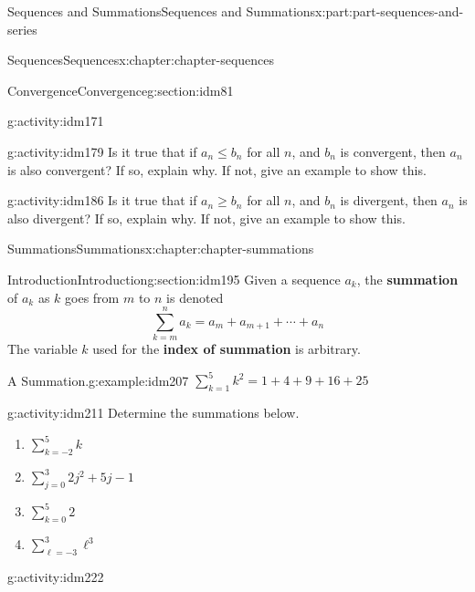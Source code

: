 \documentclass[oneside,10pt,]{book}
\newcommand{\terminology}[1]{\textbf{#1}}
\numberwithin{equation}{section}
\begin{document}
\begin{partptx}{Sequences and Summations}{}{Sequences and Summations}{}{}{x:part:part-sequences-and-series}
\begin{chapterptx}{Sequences}{}{Sequences}{}{}{x:chapter:chapter-sequences}
\begin{sectionptx}{Convergence}{}{Convergence}{}{}{g:section:idm81}
\begin{activity}{}{g:activity:idm171}
\end{activity}
\begin{activity}{}{g:activity:idm179}%
Is it true that if \(a_n \leq b_n\) for all \(n\), and \(b_n\) is convergent, then \(a_n\) is also convergent? If so, explain why. If not, give an example to show this.%
\end{activity}
\begin{activity}{}{g:activity:idm186}%
Is it true that if \(a_n \geq b_n\) for all \(n\), and \(b_n\) is divergent, then \(a_n\) is also divergent? If so, explain why. If not, give an example to show this.%
\end{activity}
\end{sectionptx}
\end{chapterptx}
%
\typeout{************************************************}
\typeout{************************************************}
%
\begin{chapterptx}{Summations}{}{Summations}{}{}{x:chapter:chapter-summations}
%
%
\typeout{************************************************}
\typeout{************************************************}
%
\begin{sectionptx}{Introduction}{}{Introduction}{}{}{g:section:idm195}
Given a sequence \(a_k\), the \terminology{summation} of \(a_k\) as \(k\) goes from \(m\) to \(n\) is denoted%
\begin{equation*}
\sum_{k=m}^n a_k = a_m + a_{m+1} + \cdots + a_n
\end{equation*}
The variable \(k\) used for the \terminology{index of summation} is arbitrary.%
\begin{example}{A Summation.}{g:example:idm207}%
\(\displaystyle\sum_{k = 1}^5 k^2 = 1 + 4 + 9 + 16 + 25\)%
\end{example}
\begin{activity}{}{g:activity:idm211}%
Determine the summations below.%
\begin{enumerate}[font=\bfseries,label=(\alph*),ref=\alph*]
\item{}\(\displaystyle\sum_{k = -2}^5 k\)\item{}\(\displaystyle\sum_{j = 0}^3 2j^2+5j-1\)\item{}\(\displaystyle\sum_{k = 0}^5 2\)\item{}\(\displaystyle\sum_{\ell = -3}^3 \ell^3\)\end{enumerate}
\end{activity}
\begin{activity}{}{g:activity:idm222}%

\end{activity}
\end{sectionptx}
\end{chapterptx}
\end{partptx}
\end{document}
